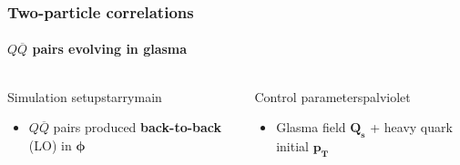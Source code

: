\documentclass[aspectratio=169,11pt,usenames,dvipsnames]{beamer}
\begin{document}
\begin{frame}
    \frametitle{Two-particle correlations}
    \framesubtitle{$Q\overline{Q}$ pairs evolving in glasma}
    \vspace{-15pt}
    \begin{center}
        \begin{columns}[onlytextwidth,t]
           \begin{center}
                \begin{custombox2}{\normalsize Simulation setup}{starrymain}
                    \small
                    \begin{varwidth}{\textwidth}
                    \begin{itemize}\itemsep0em 
                        \itemsep0em
                        \footnotesize
                        \item $Q\overline{Q}$ pairs produced {\bfseries back-to-back} (LO) in $\boldsymbol{\phi}$
                    \end{itemize}
                    \end{varwidth}
                \end{custombox2}
            \end{center}
            \begin{center}
                \begin{custombox2}{\normalsize Control parameters}{palviolet}
                    \small
                    \begin{varwidth}{0.95\textwidth}
                    \begin{itemize}\itemsep0em 
                        \itemsep0em
                        \footnotesize
                        \item Glasma field {\color{palviolet}$\boldsymbol{Q_s}$} + heavy quark initial {\color{palviolet}$\boldsymbol{p_T}$}
                    \end{itemize}
                    \end{varwidth}
                \end{custombox2}
            \end{center}
        \end{columns}    


\end{center}
\end{frame}
\end{document}
